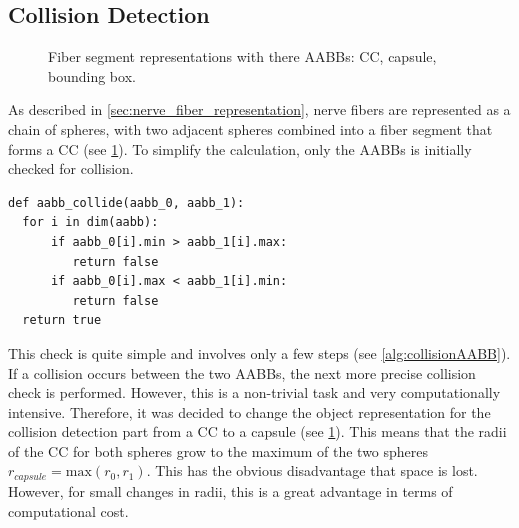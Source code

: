\subsection{Collision Detection}
\label{sec:collisionDetection}
%
\begin{figure}[!t]
    \centering
    \setlength{\tikzwidth}{0.75\textwidth}
    \tikzset{external/export=false}
	\caption[cc and co]{Fiber segment representations with there \acp{AABB}:  \ac{CC},  capsule,  bounding box.}
	\label{fig:conical_capsule}
\end{figure}
% 
As described in \cref{sec:nerve_fiber_representation}, nerve fibers are represented as a chain of spheres, with two adjacent spheres combined into a fiber segment that forms a \ac{CC} (see \cref{fig:conical_capsule}).
To simplify the calculation, only the \acp{AABB} is initially checked for collision.
%
\begin{lstfloat}[!tb]
\lstset{style=python}
\begin{lstlisting}[]
def aabb_collide(aabb_0, aabb_1):
  for i in dim(aabb):
      if aabb_0[i].min > aabb_1[i].max:
         return false
      if aabb_0[i].max < aabb_1[i].min:
         return false
  return true
\end{lstlisting}
\caption{Pseudocode collision between \acp{AABB}.}
\label{alg:collisionAABB}
\end{lstfloat}
%
This check is quite simple and involves only a few steps (see \cref{alg:collisionAABB}).
If a collision occurs between the two \acp{AABB}, the next more precise collision check is performed.
However, this is a non-trivial task and very computationally intensive.
Therefore, it was decided to change the object representation for the collision detection part from a \ac{CC} to a capsule (see \cref{fig:conical_capsule}).
This means that the radii of the \ac{CC} for both spheres grow to the maximum of the two spheres $r_{\mathit{capsule}} = \mathrm{max}(r_0, r_1)$.
This has the obvious disadvantage that space is lost. However, for small changes in radii, this is a great advantage in terms of computational cost.
\par
% 
